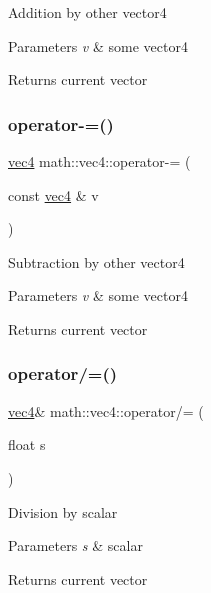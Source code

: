 Addition by other vector4 
\begin{DoxyParams}{Parameters}
{\em v} & some vector4 \\
\hline
\end{DoxyParams}
\begin{DoxyReturn}{Returns}
current vector 
\end{DoxyReturn}
\mbox{\label{structmath_1_1vec4_a2ab8d4652ee7f7d4150d669b188fd70f}} 
\subsubsection{\texorpdfstring{operator-\/=()}{operator-=()}}
{\footnotesize\ttfamily \hyperlink{structmath_1_1vec4}{vec4} math\+::vec4\+::operator-\/= (\begin{DoxyParamCaption}\item[{const \hyperlink{structmath_1_1vec4}{vec4} \&}]{v }\end{DoxyParamCaption})\hspace{0.3cm}{\ttfamily [inline]}}

Subtraction by other vector4 
\begin{DoxyParams}{Parameters}
{\em v} & some vector4 \\
\hline
\end{DoxyParams}
\begin{DoxyReturn}{Returns}
current vector 
\end{DoxyReturn}
\mbox{\label{structmath_1_1vec4_a659b3011316a6d357be57dd69a1f7217}} 
\subsubsection{\texorpdfstring{operator/=()}{operator/=()}}
{\footnotesize\ttfamily \hyperlink{structmath_1_1vec4}{vec4}\& math\+::vec4\+::operator/= (\begin{DoxyParamCaption}\item[{float}]{s }\end{DoxyParamCaption})\hspace{0.3cm}{\ttfamily [inline]}}

Division by scalar 
\begin{DoxyParams}{Parameters}
{\em s} & scalar \\
\hline
\end{DoxyParams}
\begin{DoxyReturn}{Returns}
current vector 
\end{DoxyReturn}
\mbox{\label{structmath_1_1vec4_af467f0f57b5071d1dba3e5ddc1dc1c15}} 
